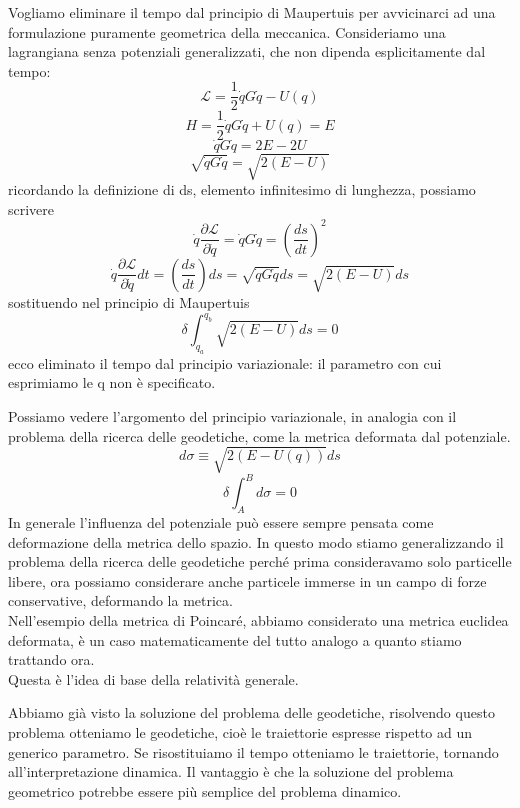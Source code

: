 \documentclass[
10pt, %
a4paper, %
oneside, %
headinclude,footinclude, %
BCOR5mm, %
]{scrartcl}
\begin{document}
Vogliamo eliminare il tempo dal principio di Maupertuis per avvicinarci ad una formulazione puramente geometrica della meccanica. Consideriamo una lagrangiana senza potenziali generalizzati, che non dipenda esplicitamente dal tempo: 
\[\mathcal{L} = \frac{1}{2}\dot{q}G\dot{q} -U(q)\]
\[H  = \frac{1}{2}\dot{q}G\dot{q} +U(q) = E\]
\[\dot{q}G\dot{q} = 2E-2U\]
\[\sqrt{\dot{q}G\dot{q}} = \sqrt{2(E-U)}\]
ricordando la definizione di ds, elemento infinitesimo di lunghezza, possiamo scrivere
\[\dot{q}\frac{\partial \mathcal{L}}{\partial \dot{q}} = \dot{q}G\dot{q} = \left(\frac{ds}{dt}\right)^2\]
\[\dot{q}\frac{\partial \mathcal{L}}{\partial \dot{q}}dt = \left(\frac{ds}{dt}\right)ds =  \sqrt{\dot{q}G\dot{q}}ds = \sqrt{2(E-U)}ds\]
sostituendo nel principio di Maupertuis
\[\delta\int_{q_a}^{q_b}\sqrt{2(E-U)}ds =  0\]
ecco eliminato il tempo dal principio variazionale: il parametro con cui esprimiamo le q non è specificato.
\begin{osservazione}
	Possiamo vedere l'argomento del principio variazionale, in analogia con il problema della ricerca delle geodetiche, come la metrica deformata dal potenziale.
	\[d\sigma \equiv \sqrt{2(E-U(q))}ds\]
	\[\delta\int_{A}^{B}d\sigma = 0\]
	In generale l'influenza del potenziale può essere sempre pensata come deformazione della metrica dello spazio. In questo modo stiamo generalizzando il problema della ricerca delle geodetiche perché prima consideravamo solo particelle libere, ora possiamo considerare anche particele immerse in un campo di forze conservative, deformando la metrica.\\
	Nell'esempio della metrica di Poincaré, abbiamo considerato una metrica euclidea deformata, è un caso matematicamente del tutto analogo a quanto stiamo trattando ora.\\
	Questa è l'idea di base della relatività generale.
\end{osservazione}
Abbiamo già visto la soluzione del problema delle geodetiche, risolvendo questo problema otteniamo le geodetiche, cioè le traiettorie espresse rispetto ad un generico parametro. Se risostituiamo il tempo otteniamo le traiettorie, tornando all'interpretazione dinamica. Il vantaggio è che la soluzione del problema geometrico potrebbe essere più semplice del problema dinamico. 
\end{document}
